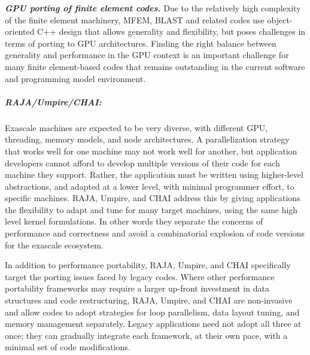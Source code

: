 \noindent
{\bf \em GPU porting of finite element codes.}
Due to the relatively high complexity of the finite element machinery, MFEM,
BLAST and related codes use object-oriented C++ design that allows generality
and flexibility, but poses challenges in terms of porting to GPU architectures.
Finding the right balance between generality and performance in the GPU context
is an important challenge for many finite element-based codes that remains
outstanding in the current software and programming model environment.

\subparagraph{RAJA/Umpire/CHAI:}
Exascale machines are expected to be very diverse, with different GPU,
threading, memory models, and node architectures.  A parallelization
strategy that works well for one machine may not work well for another,
but application developers cannot afford to develop multiple versions of
their code for each machine they support.  Rather, the application must
be written using higher-level abstractions, and adapted at a lower level,
with minimal programmer effort, to specific machines.  RAJA, Umpire, and
CHAI address this by giving applications the flexibility to adapt and
tune for many target machines, using the same high level kernel
formulations.  In other words they separate the concerns of performance
and correctness and avoid a combinatorial explosion of code versions for
the exascale ecosystem.

In addition to performance portability, RAJA, Umpire, and CHAI
specifically target the porting issues faced by legacy codes.  Where
other performance portability frameworks may require a larger up-front
investment in data structures and code restructuring, RAJA, Umpire, and
CHAI are non-invasive and allow codes to adopt strategies for loop
parallelism, data layout tuning, and memory management separately.
Legacy applications need not adopt all three at once; they can gradually
integrate each framework, at their own pace, with a minimal set of code
modifications.


